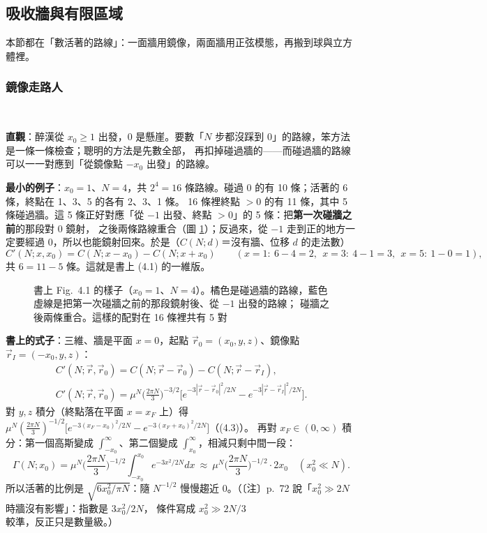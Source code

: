 \subsection{吸收牆與有限區域}
\quad 本節都在「數活著的路線」：一面牆用鏡像，兩面牆用正弦模態，再搬到球與立方體裡。

\subsubsection{鏡像走路人}
\ 

\textbf{直觀}：醉漢從 $x_0\ge1$ 出發，0 是懸崖。要數「$N$ 步都沒踩到 0」的路線，笨方法是一條一條檢查；聰明的方法是先數全部，
再扣掉碰過牆的——而碰過牆的路線可以一一對應到「從鏡像點 $-x_0$ 出發」的路線。

\textbf{最小的例子}：$x_0=1$、$N=4$，共 $2^4=16$ 條路線。碰過 0 的有 10 條；活著的 6 條，終點在 1、3、5 的各有 2、3、1 條。
16 條裡終點 $>0$ 的有 11 條，其中 5 條碰過牆。這 5 條正好對應「從 $-1$ 出發、終點 $>0$」的 5 條：把\textbf{第一次碰牆之前}的那段對 0 鏡射，
之後兩條路線重合（圖 \ref{four-fig-mirror}）；反過來，從 $-1$ 走到正的地方一定要經過 0，所以也能鏡射回來。於是（$C(N;d)$＝沒有牆、位移 $d$ 的走法數）
\[C'(N;x,x_0)=C(N;x-x_0)-C(N;x+x_0)\qquad(x=1{:}\ 6-4=2,\ \ x=3{:}\ 4-1=3,\ \ x=5{:}\ 1-0=1),\]
共 $6=11-5$ 條。這就是書上 (4.1) 的一維版。
\begin{figure}[H]
\centering
\FourFigMirror
\caption{書上 Fig.~4.1 的樣子（$x_0=1$、$N=4$）。橘色是碰過牆的路線，藍色虛線是把第一次碰牆之前的那段鏡射後、從 $-1$ 出發的路線；
碰牆之後兩條重合。這樣的配對在 16 條裡共有 5 對}\label{four-fig-mirror}
\end{figure}

\textbf{書上的式子}：三維、牆是平面 $x=0$，起點 $\vec r_0=(x_0,y,z)$、鏡像點 $\vec r_I=(-x_0,y,z)$：
\begin{gather*}
C'(N;\vec r,\vec r_0)=C(N;\vec r-\vec r_0)-C(N;\vec r-\vec r_I),\tag{4.1}\\
C'(N;\vec r,\vec r_0)=\mu^N\Big(\frac{2\pi N}{3}\Big)^{-3/2}\Big[e^{-3|\vec r-\vec r_0|^2/2N}-e^{-3|\vec r-\vec r_I|^2/2N}\Big].\tag{4.2}
\end{gather*}
對 $y,z$ 積分（終點落在平面 $x=x_F$ 上）得 $\mu^N(\frac{2\pi N}{3})^{-1/2}\big[e^{-3(x_F-x_0)^2/2N}-e^{-3(x_F+x_0)^2/2N}\big]$（(4.3)）。
再對 $x_F\in(0,\infty)$ 積分：第一個高斯變成 $\int_{-x_0}^\infty$、第二個變成 $\int_{x_0}^\infty$，相減只剩中間一段：
\[\Gamma(N;x_0)=\mu^N\Big(\frac{2\pi N}{3}\Big)^{-1/2}\int_{-x_0}^{x_0}e^{-3x^2/2N}dx\ \approx\ \mu^N\Big(\frac{2\pi N}{3}\Big)^{-1/2}\cdot2x_0\quad(x_0^2\ll N).\tag{4.4c, 4.5}\]
所以活著的比例是 $\sqrt{6x_0^2/\pi N}$：隨 $N^{-1/2}$ 慢慢趨近 0。（〔注〕p.~72 說「$x_0^2\gg2N$ 時牆沒有影響」：指數是 $3x_0^2/2N$，
條件寫成 $x_0^2\gg2N/3$ 較準，反正只是數量級。）


